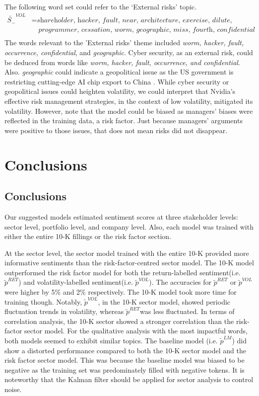 \documentclass[logo,bsc,singlespacing,parskip]{infthesis}
\begin{document}
The following word set could refer to the ‘External risks’ topic.
\begin{align*}
\tilde{S_{-}}^{VOL} &= \textit{shareholder, hacker, fault, near, architecture, exercise, dilute, occurrence,} \\
               &\quad \textit{programmer, cessation, worm, geographic, miss, fourth, confidential} \\
\end{align*}
The words relevant to the 'External risks' theme included \textit{worm, hacker, fault, occurrence, confidential}, and \textit{geographic}. Cyber security, as an external risk, could be deduced from words like \textit{worm, hacker, fault, occurrence, and confidential}. Also. \textit{geographic} could indicate a geopolitical issue as the US government is restricting cutting-edge AI chip export to China \cite{sevastopulo2023uschina}. While cyber security or geopolitical issues 
could heighten volatility, we could interpret that Nvidia's effective risk management strategies, in the context of low volatility, mitigated its volatility. However, note that the model could be biased as managers' biases were reflected in the training data, a risk factor. Just because managers’ arguments were positive to those issues, that does not mean risks did not disappear\cite{yu2024uschinadoomsday}.

\chapter{Conclusions}

\section{Conclusions}

Our suggested models estimated sentiment scores at three stakeholder levels: sector level, portfolio level, and company level. Also, each model was trained with either the entire 10-K fillings or the risk factor section. 

At the sector level, the sector model trained with the entire 10-K provided more informative sentiments than the risk-factor-centred sector model. The 10-K model outperformed the risk factor model for both the return-labelled sentiment(i.e. $\tilde{p}^{RET}$) and volatility-labelled sentiment(i.e. $\tilde{p}^{VOL}$). The accuracies for $\tilde{p}^{RET}$ or $\tilde{p}^{VOL}$ were higher by 5\% and 2\% respectively. The 10-K model took more time for training though. Notably, $\tilde{p}^{VOL}$, in the 10-K sector model, showed periodic fluctuation trends in volatility, whereas $\tilde{p}^{RET}$was less fluctuated. In terms of correlation analysis, the 10-K sector showed a stronger correlation than the risk-factor sector model. For the qualitative analysis with the most impactful words, both models seemed to exhibit similar topics. The baseline model (i.e. $\tilde{p}^{LM}$) did show a distorted performance compared to both the 10-K sector model and the risk factor sector model. This was because the baseline model was biased to be negative as the training set was predominately filled with negative tokens. It is noteworthy that the Kalman filter should be applied for sector analysis to control noise.
\end{document}
